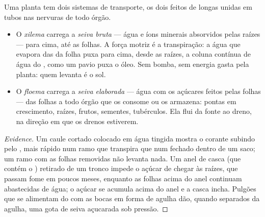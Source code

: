 \begin{proposition}\label{prop:g12:plant-rooted-life:saps}
Uma planta tem dois sistemas de transporte, os dois feitos de 
longas unidas em tubos nas nervuras de todo órgão.
\begin{itemize}
  \item O \emph{xilema} carrega a \emph{seiva bruta} ---
        água e íons minerais absorvidos pelas raízes --- para cima, até
        as folhas. A força motriz é a transpiração: a água que evapora
        das  da folha puxa para cima, desde as raízes, a coluna
        contínua de água do , como um pavio puxa o óleo. Sem
        bomba, sem energia gasta pela planta: quem levanta é o sol.
  \item O \emph{floema} carrega a \emph{seiva elaborada}
        --- água com os açúcares feitos pelas folhas --- das folhas a
        todo órgão que os consome ou os armazena: pontas em
        crescimento, raízes, frutos, sementes, tubérculos. Ela flui da
        fonte ao dreno, na direção em que os drenos estiverem.
\end{itemize}
\end{proposition}
\begin{proof}[Evidence]
Um caule cortado colocado em água tingida mostra o corante subindo pelo
, mais rápido num ramo que transpira que num fechado dentro de um
saco; um ramo com as folhas removidas não levanta nada. Um anel de
casca (que contém o ) retirado de um tronco impede o açúcar de
chegar às raízes, que passam fome em poucos meses, enquanto as folhas
acima do anel continuam abastecidas de água; o açúcar se acumula acima
do anel e a casca incha. Pulgões que se alimentam do  com as
bocas em forma de agulha dão, quando separados da agulha, uma gota de
seiva açucarada sob pressão.
\end{proof}

